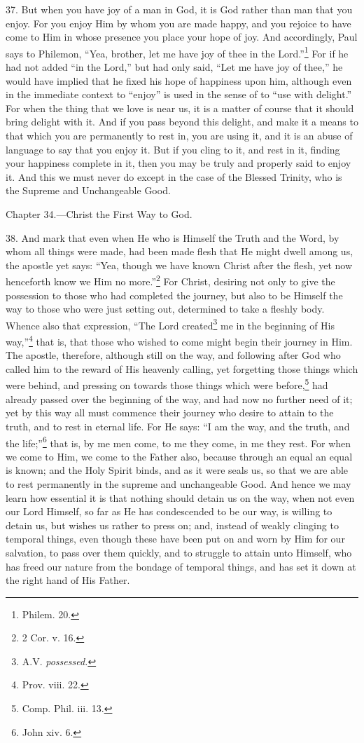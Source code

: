 37. But when you have joy of a man in God, it is God rather than man that you enjoy. For you enjoy Him by whom you are made happy, and you rejoice to have come to Him in whose presence you place your hope of joy. And accordingly, Paul says to Philemon, “Yea, brother, let me have joy of thee in the Lord.”\footnote{Philem. 20.} For if he had not added “in the Lord,” but had only said, “Let me have joy of thee,” he would have implied that he fixed his hope of happiness upon him, although even in the immediate context to “enjoy” is used in the sense of to “use with delight.” For when the thing that we love is near us, it is a matter of course that it should bring delight with it. And if you pass beyond this delight, and make it a means to that which you are permanently to rest in, you are using it, and it is an abuse of language to say that you enjoy it. But if you cling to it, and rest in it, finding your happiness complete in it, then you may be truly and properly said to enjoy it. And this we must never do except in the case of the Blessed Trinity, who is the Supreme and Unchangeable Good.


Chapter 34.—Christ the First Way to God.

38. And mark that even when He who is Himself the Truth and the Word, by whom all things were made, had been made flesh that He might dwell among us, the apostle yet says: “Yea, though we have known Christ after the flesh, yet now henceforth know we Him no more.”\footnote{2 Cor. v. 16.} For Christ, desiring not only to give the possession to those who had completed the journey, but also to be Himself the way to those who were just setting out, determined to take a fleshly body. Whence also that expression, “The Lord created\footnote{A.V. \emph{possessed.}} me in the beginning of His way,”\footnote{Prov. viii. 22.} that is, that those who wished to come might begin their journey in Him. The apostle, therefore, although still on the way, and following after God who called him to the reward of His heavenly calling, yet forgetting those things which were behind, and pressing on towards those things which were before,\footnote{Comp. Phil. iii. 13.} had already passed over the beginning of the way, and had now no further need of it; yet by this way all must commence their journey who desire to attain to the truth, and to rest in eternal life. For He says: “I am the way, and the truth, and the life;”\footnote{John xiv. 6.} that is, by me men come, to me they come, in me they rest. For when we come to Him, we come to the Father also, because through an equal an equal is known; and the Holy Spirit binds, and as it were seals us, so that we are able to rest permanently in the supreme and unchangeable Good. And hence we may learn how essential it is that nothing should detain us on the way, when not even our Lord Himself, so far as He has condescended to be our way, is willing to detain us, but wishes us rather to press on; and, instead of weakly clinging to temporal things, even though these have been put on and worn by Him for our salvation, to pass over them quickly, and to struggle to attain unto Himself, who has freed our nature from the bondage of temporal things, and has set it down at the right hand of His Father.

